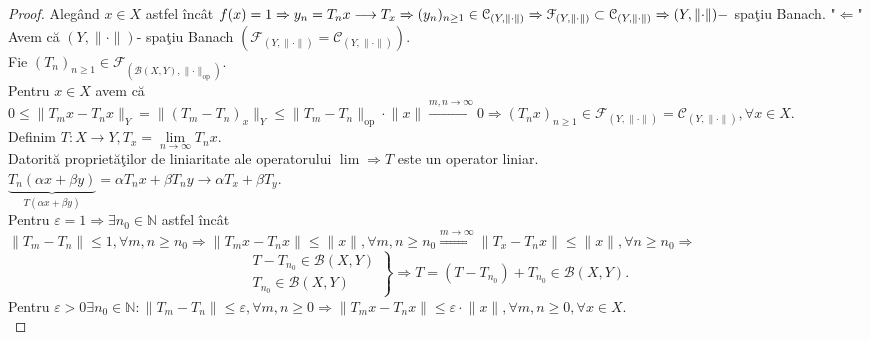 \documentclass[ a4paper, 12pt]{report}
\theoremstyle{remark}
\numberwithin{equation}{section}
\begin{document}
\begin{proof}
Aleg\^and $x \in X$ astfel \^inc\^at $f(x) = 1 \Rightarrow y_n = T_n x \longrightarrow T_x \Rightarrow\\ (y_n)_{n \geq 1} \in \mathcal{C}_{(Y,\lVert \cdot \rVert)} \Rightarrow \mathcal{F}_{(Y,\lVert \cdot \rVert)} \subset \mathcal{C}_{(Y,\lVert \cdot \rVert)} \Rightarrow (Y,\lVert \cdot \rVert)-$ spa\c tiu Banach.
"$\Longleftarrow$"\\
Avem c\u a $(Y,\lVert \cdot \rVert)$- spa\c tiu Banach $(\mathcal{F}_{(Y,\lVert \cdot \rVert)}= \mathcal{C}_{(Y,\lVert \cdot \rVert)}).$\\
Fie $(T_n)_{n \geq 1} \in \mathcal{F}_{\left( \mathcal{B}(X,Y),\lVert \cdot \rVert_{\mbox{op}}\right)}.$\\
Pentru  $x \in X$ avem c\u a $0 \leq
\lVert T_m x - T_n x \rVert_{Y} = \lVert (T_m - T_n )_x \rVert_{Y} \leq \lVert T_m-T_n  \rVert_{\mbox{op}} \cdot \lVert x \rVert \stackrel{m,n \rightarrow \infty}{\longrightarrow} 0 \Rightarrow (T_n x)_{n \geq 1} \in \mathcal{F}_{(Y,\lVert \cdot \rVert)} = \mathcal{C}_{(Y,\lVert \cdot \rVert)}, \forall x \in X.$\\
Definim $T : X \rightarrow Y, T_x = \lim\limits_{n \rightarrow \infty}T_n x.$\\
Datorit\u a propriet\u a\c tilor  de liniaritate ale operatorului $\lim \Rightarrow T$ este un operator liniar.\\
$\underbrace{T_n(\alpha x + \beta y)}_{T(\alpha x+\beta y)} = \alpha T_n x + \beta T_n y \longrightarrow \alpha T_x + \beta T_y.$\\
Pentru $\varepsilon = 1 \Rightarrow \exists n_0 \in \mathbb{N}$ astfel \^inc\^at $\lVert T_m-T_n \rVert \leq 1, \forall m,n \geq n_0 \Rightarrow \lVert T_m x - T_n x \rVert \leq \lVert x \rVert, \forall m,n \geq n_0 \stackrel{m \rightarrow \infty}{\Longrightarrow} \lVert T_x - T_n x \rVert \leq \lVert x \rVert, \forall n \geq n_0 \Rightarrow$
\begin{equation*}
  \left.\begin{aligned}
         T - T_{n_0} \in \mathcal{B}(X,Y)\\
         T_{n_0} \in \mathcal{B}(X,Y)
        \end{aligned}
  \right\}
  \mbox{$\Rightarrow T = (T - T_{n_0}) + T_{n_0} \in \mathcal{B}(X,Y)$.}
 \end{equation*}
Pentru $\varepsilon >0 \exists n_0 \in \mathbb{N}: \lVert T_m - T_n \rVert \leq \varepsilon, \forall m,n \geq 0 \Rightarrow  \lVert T_m x - T_n x \rVert \leq \varepsilon \cdot  \lVert x \rVert, \forall m,n \geq 0, \forall x \in X.$\\

\end{proof}
\end{document}
